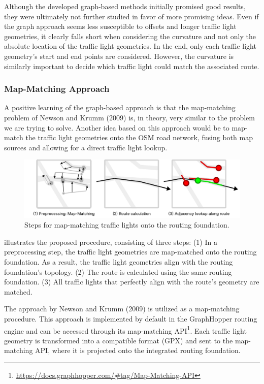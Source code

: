 Although the developed graph-based methods initially promised good results, they were ultimately not further studied in favor of more promising ideas. Even if the graph approach seems less susceptible to offsets and longer traffic light geometries, it clearly falls short when considering the curvature and not only the absolute location of the traffic light geometries. In the end, only each traffic light geometry's start and end points are considered. However, the curvature is similarly important to decide which traffic light could match the associated route.

\subsubsection{Map-Matching Approach}

A positive learning of the graph-based approach is that the map-matching problem of Newson and Krumm (2009) \cite{newson_hidden_2009} is, in theory, very similar to the problem we are trying to solve. Another idea based on this approach would be to map-match the traffic light geometries onto the OSM road network, fusing both map sources and allowing for a direct traffic light lookup.

\begin{figure}[b]
\centering
\includegraphics[width=\linewidth]{images/sg-selection-map-matching-approach.pdf}
\caption{Steps for map-matching traffic lights onto the routing foundation.}
\label{fig:sg-selection-map-matching-approach}
\end{figure}

 illustrates the proposed procedure, consisting of three steps: (1) In a preprocessing step, the traffic light geometries are map-matched onto the routing foundation. As a result, the traffic light geometries align with the routing foundation's topology. (2) The route is calculated using the same routing foundation. (3) All traffic lights that perfectly align with the route's geometry are matched.

The approach by Newson and Krumm (2009) \cite{newson_hidden_2009} is utilized as a map-matching procedure. This approach is implemented by default in the GraphHopper routing engine and can be accessed through its map-matching API\footnote{\url{https://docs.graphhopper.com/\#tag/Map-Matching-API}}. Each traffic light geometry is transformed into a compatible format (GPX) and sent to the map-matching API, where it is projected onto the integrated routing foundation.

